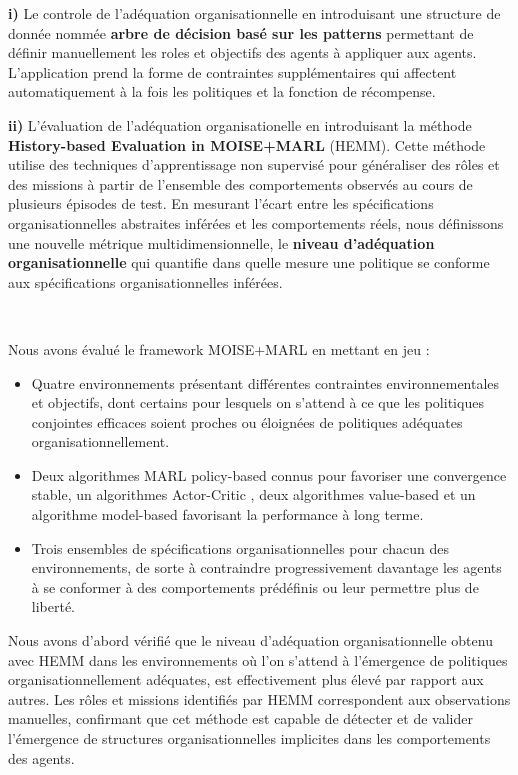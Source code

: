 \documentclass[sigconf,anonymous]{aamas}
\begin{document}
\quad \textbf{i)} Le controle de l'adéquation organisationnelle en introduisant une structure de donnée nommée \textbf{arbre de décision basé sur les patterns} permettant de définir manuellement les roles et objectifs des agents à appliquer aux agents. L'application prend la forme de contraintes supplémentaires qui affectent automatiquement à la fois les politiques et la fonction de récompense.

\quad \textbf{ii)} L'évaluation de l'adéquation organisationelle en introduisant la méthode \textbf{History-based Evaluation in MOISE+MARL} (HEMM). Cette méthode utilise des techniques d'apprentissage non supervisé pour généraliser des rôles et des missions à partir de l'ensemble des comportements observés au cours de plusieurs épisodes de test. En mesurant l'écart entre les spécifications organisationnelles abstraites inférées et les comportements réels, nous définissons une nouvelle métrique multidimensionnelle, le \textbf{niveau d'adéquation organisationnelle} qui quantifie dans quelle mesure une politique se conforme aux spécifications organisationnelles inférées.

\

\noindent Nous avons évalué le framework MOISE+MARL en mettant en jeu :
\begin{itemize}
  \item Quatre environnements présentant différentes contraintes environnementales et objectifs, dont certains pour lesquels on s'attend à ce que les politiques conjointes efficaces soient proches ou éloignées de politiques adéquates organisationnellement. %
  \item Deux algorithmes MARL policy-based
  connus pour favoriser une convergence stable, un algorithmes Actor-Critic
  , deux algorithmes value-based
  et un algorithme model-based
  favorisant la performance à long terme.
  \item Trois ensembles de spécifications organisationnelles pour chacun des environnements, de sorte à contraindre progressivement davantage les agents à se conformer à des comportements prédéfinis ou leur permettre plus de liberté.
\end{itemize}


Nous avons d'abord vérifié que le niveau d'adéquation organisationnelle obtenu avec HEMM dans les environnements où l'on s'attend à l'émergence de politiques organisationnellement adéquates, est effectivement plus élevé par rapport aux autres. Les rôles et missions identifiés par HEMM correspondent aux observations manuelles, confirmant que cet méthode est capable de détecter et de valider l'émergence de structures organisationnelles implicites dans les comportements des agents.
\end{document}
